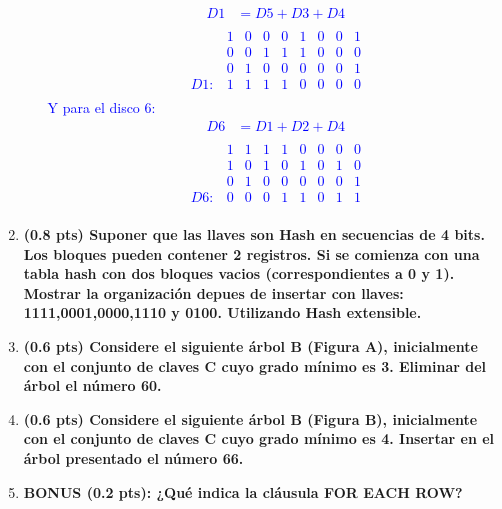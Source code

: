 \documentclass{templateNote}
\begin{document}
\begin{enumerate}
\begin{enumerate}
        \textcolor{blue}{
            \begin{align*}
                D1 &= D5 + D3 + D4 \\
            \end{align*}
            \begin{equation*}
                \begin{array}{ccccccccc}
                        & 1 & 0 & 0 & 0 & 1 & 0 & 0 & 1 \\
                        & 0 & 0 & 1 & 1 & 1 & 0 & 0 & 0 \\
                        & 0 & 1 & 0 & 0 & 0 & 0 & 0 & 1 \\ \hline
                    D1: & 1 & 1 & 1 & 1 & 0 & 0 & 0 & 0 \\
                \end{array}
            \end{equation*}
            Y para el disco 6:
            \begin{align*}
                D6 &= D1 + D2 + D4 \\
            \end{align*}
            \begin{equation*}
                \begin{array}{ccccccccc}
                        & 1 & 1 & 1 & 1 & 0 & 0 & 0 & 0 \\
                        & 1 & 0 & 1 & 0 & 1 & 0 & 1 & 0 \\
                        & 0 & 1 & 0 & 0 & 0 & 0 & 0 & 1 \\ \hline
                    D6: & 0 & 0 & 0 & 1 & 1 & 0 & 1 & 1 \\
                \end{array}
            \end{equation*}    
        }
    \end{enumerate}

    \item \textbf{(0.8 pts) Suponer que las llaves son Hash en secuencias de 4 bits. Los bloques pueden contener 2 registros. Si se comienza con una tabla hash con dos bloques vacios (correspondientes a 0 y 1). Mostrar la organización depues de insertar con llaves: 1111,0001,0000,1110 y 0100. Utilizando Hash extensible.}
    \item \textbf{(0.6 pts) Considere el siguiente árbol B (Figura A), inicialmente con el conjunto de claves C cuyo grado mínimo es 3. Eliminar del árbol el número 60.}
    \item \textbf{(0.6 pts) Considere el siguiente árbol B (Figura B), inicialmente con el conjunto de claves C cuyo grado mínimo es 4. Insertar en el árbol presentado el número 66.}
    \item \textbf{BONUS (0.2 pts): ¿Qué indica la cláusula FOR EACH ROW?}
\end{enumerate}


    
    
    
\end{document}
